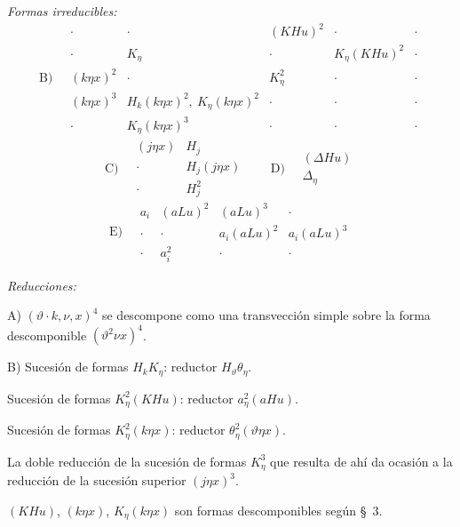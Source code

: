 \documentclass[11pt]{article}
\newcommand{\A}{\Delta}
\begin{document}
\noindent\emph{Formas irreducibles:}
\[
\text{B)}\quad
\begin{array}{c|c|c|c|c}
\cdot&\cdot&(KHu)^2&\cdot&\cdot\\
\cdot&K_\eta&\cdot&K_\eta(KHu)^2&\cdot\\
(k\eta x)^2&\cdot&K_\eta^2&\cdot&\cdot\\
(k\eta x)^3&H_k(k\eta x)^2,\ K_\eta(k\eta x)^2&\cdot&\cdot&\cdot\\
\cdot&K_\eta(k\eta x)^3&\cdot&\cdot&\cdot
\end{array}
\]
\[
\text{C)}\quad
\begin{array}{cc}
(j\eta x)&H_j\\
\cdot&H_j(j\eta x)\\
\cdot&H_j^2
\end{array}
\qquad
\text{D)}\quad
\begin{array}{c}
(\A Hu)\\\A_\eta
\end{array}
\]
\[
\text{E)}\quad
\begin{array}{cccc}
a_i&(aLu)^2&(aLu)^3&\cdot\\
\cdot&\cdot&a_i(aLu)^2&a_i(aLu)^3\\
\cdot&a_i^2&\cdot&\cdot
\end{array}
\]

\noindent\emph{Reducciones:}

\noindent A) $(\vartheta\cdot k,\nu,x)^4$ se descompone como una transvección simple sobre la forma descomponible $(\vartheta^2\nu x)^4$.

\noindent B) Sucesión de formas $H_kK_\eta$: reductor $H_\vartheta\theta_\eta$.

Sucesión de formas $K_\eta^2(KHu)$: reductor $a_\eta^2(aHu)$.

Sucesión de formas $K_\eta^2(k\eta x)$: reductor $\theta_\eta^2(\vartheta\eta x)$.

La doble reducción de la sucesión de formas $K_\eta^3$ que resulta de ahí da ocasión a la reducción de la sucesión superior $(j\eta x)^3$.

$(KHu)$, $(k\eta x)$, $K_\eta(k\eta x)$ son formas descomponibles según \S\ 3.
\end{document}
